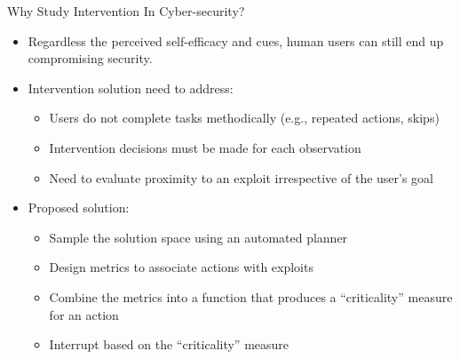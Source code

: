\begin{frame}{Why Study Intervention In Cyber-security?}
\begin{itemize}
\item Regardless the perceived self-efficacy and cues, human users can still end up compromising security.
\item Intervention solution need to address:
\begin{itemize}
\item Users do not complete tasks methodically (e.g., repeated actions, skips)
\item Intervention decisions must be made for each observation
\item Need to evaluate proximity to an exploit irrespective of the user's goal
\end{itemize}
\item Proposed solution:
\begin{itemize}
\item Sample the solution space using an automated planner
\item Design metrics to associate actions with exploits
\item Combine the metrics into a function that produces a ``criticality'' measure for an action
\item Interrupt based on the ``criticality'' measure
\end{itemize}
\end{itemize}
\end{frame}